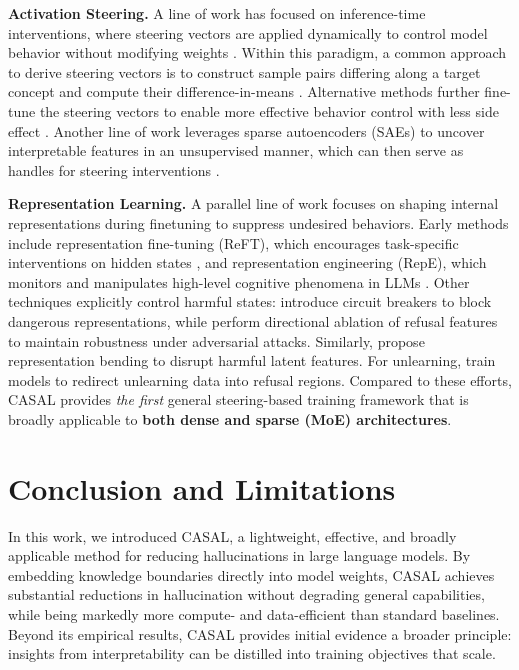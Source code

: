 \documentclass{article} %
\begin{document}
\textbf{Activation Steering.} A line of work has focused on inference-time interventions, where steering vectors are applied dynamically to control model behavior without modifying weights \citep{calibratinguncertaintylinear, li2024inferencetimeinterventionelicitingtruthful}. Within this paradigm, a common approach to derive steering vectors is to construct sample pairs differing along a target concept and compute their difference-in-means \citep{arditi2024refusal}. Alternative methods further fine-tune the steering vectors to enable more effective behavior control with less side effect \citep{cao2024personalized,stickland2024steering,parekh2025learning}.  Another line of work leverages sparse autoencoders (SAEs) to uncover interpretable features in an unsupervised manner, which can then serve as handles for steering interventions \citep{ferrando2025entity}.

\textbf{Representation Learning.} A parallel line of work \citep{tian2025representationengineeringvisual,yu2024mechanistic,chen2025personavectors,ablationfinetuning} focuses on shaping internal representations during finetuning to suppress undesired behaviors. Early methods include representation fine-tuning (ReFT), which encourages task-specific interventions on hidden states \citep{wu2024reftrepresentationfinetuning}, and representation engineering (RepE), which monitors and manipulates high-level cognitive phenomena in LLMs \citep{zou2025representationengineering}. Other techniques explicitly control harmful states: \citet{zou2024circuitbreaker} introduce circuit breakers to block dangerous representations, while \citet{yu2024refat} perform directional ablation of refusal features to maintain robustness under adversarial attacks. Similarly, \citet{representationbending} propose representation bending to disrupt harmful latent features. For unlearning, \citet{shen2025lunar} train models to redirect unlearning data into refusal regions. Compared to these efforts, CASAL provides \emph{the first} general steering-based training framework that is broadly applicable to \textbf{both dense and sparse (MoE) architectures}.

\section{Conclusion and Limitations}
In this work, we introduced CASAL, a lightweight, effective, and broadly applicable method for reducing hallucinations in large language models. By embedding knowledge boundaries directly into model weights, CASAL achieves substantial reductions in hallucination without degrading general capabilities, while being markedly more compute- and data-efficient than standard baselines. Beyond its empirical results, CASAL provides initial evidence a broader principle: insights from interpretability can be distilled into training objectives that scale.
\end{document}
